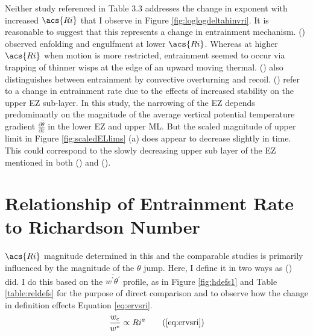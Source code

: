 Neither study referenced in Table 3.3 addresses the change in exponent with increased $\acs{Ri}$ that I observe in Figure \ref{fig:loglogdeltahinvri}.  It is reasonable to suggest that this represents a change in entrainment mechanism. \citeauthor{SullMoengStev} (\citeyear{SullMoengStev}) observed enfolding and engulfment at lower $\acs{Ri}$.  Whereas at higher $\acs{Ri}$ when motion is more restricted, entrainment seemed to occur via trapping of thinner wisps at the edge of an upward moving thermal.  \citeauthor{Turner86} (\citeyear{Turner86}) also distinguishes between entrainment by convective overturning and recoil. \citeauthor{GarciaMellado} (\citeyear{GarciaMellado}) refer to a change in entrainment rate due to the effects of increased stability on the upper \acs{EZ} sub-layer.  In this study, the narrowing of the \acs{EZ} depends predominantly on the magnitude of the average vertical potential temperature gradient $\frac{\partial \overline{\theta}}{\partial z}$ in the lower \acs{EZ} and upper \acs{ML}.  But the scaled magnitude of upper limit in Figure \ref{fig:scaledELlims} (a) does appear to decrease slightly in time.  This could correspond to the slowly decreasing upper sub layer of the \acs{EZ} mentioned in both \citeauthor{GarciaMellado} (\citeyear{GarciaMellado}) and \citeauthor{FedConzMir04} (\citeyear{FedConzMir04}).\\

\section{Relationship of Entrainment Rate to Richardson Number}

$\acs{Ri}$ magnitude determined in this and the comparable studies is primarily influenced by the magnitude of the $\theta$ jump.  Here, I define it in two ways as \citeauthor{FedConzMir04} (\citeyear{FedConzMir04}) did.  I do this based on the $\overline{w^{'}\theta^{'}}$ profile, as in Figure \ref{fig:hdefs1} and Table \ref{table:reldefs} for the purpose of direct comparison and to observe how the change in definition effects Equation \ref{eq:ervsri}.\\

\begin{equation}
\frac{w_{e}}{w^{*}} \propto Ri^{a} \tag{\ref{eq:ervsri}}
\end{equation}

